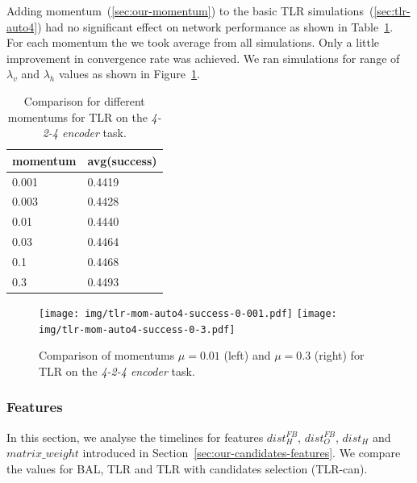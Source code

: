 Adding momentum~(\ref{sec:our-momentum}) to the basic TLR simulations~(\ref{sec:tlr-auto4}) had no significant effect on network performance as shown in Table~\ref{tab:results-mom-auto4}. For each momentum the we took average from all simulations. Only a little improvement in convergence rate was achieved. We ran simulations for range of $\lambda_v$ and $\lambda_h$ values as shown in Figure~\ref{fig:results-tlr-auto4-momentum}. 
\begin{table}[H] 
  \centering
  {\small
    \begin{tabular}{|l|l|}
    \hline
momentum & avg(success) \\
    \hline
0.001  & 0.4419 \\
    \hline
0.003  & 0.4428 \\
    \hline
0.01   & 0.4440 \\
    \hline
0.03   & 0.4464 \\
    \hline
0.1    & 0.4468 \\
    \hline
0.3    & 0.4493 \\
    \hline
    \end{tabular}
  }
  \caption{Comparison for different momentums for TLR on the \emph{4-2-4 encoder} task.} 
  \label{tab:results-mom-auto4}
\end{table}


\begin{figure}[H]
  \centering
  \texttt{[image: img/tlr-mom-auto4-success-0-001.pdf]}  
  \texttt{[image: img/tlr-mom-auto4-success-0-3.pdf]}  
   \caption{Comparison of momentums $\mu=0.01$ (left) and $\mu=0.3$ (right) for TLR on the \emph{4-2-4 encoder} task.}
  \label{fig:results-tlr-auto4-momentum}
\end{figure}


\subsubsection{Features}
In this section, we analyse the timelines for features $dist_{H}^{FB}$, $dist_{O}^{FB}$, $dist_{H}$ and $matrix\_weight$ introduced in Section~\ref{sec:our-candidates-features}. We compare the values for BAL, TLR and TLR with candidates selection (TLR-can). 


